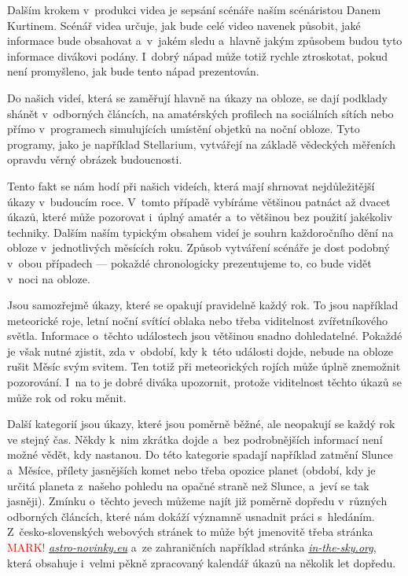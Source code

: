 \documentclass[12pt,a4paper,titlepage]{article}
\newcommand{\link}[2]{\href{#1}{\textit{#2}}}%
\newcommand{\todo}[1]{\textcolor{red}{#1}}
\begin{document}
Dalším krokem v~produkci videa je sepsání scénáře naším scénáristou Danem Kurtinem. Scénář videa určuje, jak bude celé video navenek působit, jaké informace bude obsahovat a~v~jakém sledu a~hlavně jakým způsobem budou tyto informace divákovi podány. I~dobrý nápad může totiž rychle ztroskotat, pokud není promyšleno, jak bude tento nápad prezentován.

Do našich videí, která se zaměřují hlavně na úkazy na obloze, se dají podklady shánět v~odborných článcích, na amatérských profilech na sociálních sítích nebo přímo v~programech simulujících umístění objetků na noční obloze. Tyto programy, jako je například Stellarium, vytvářejí na základě vědeckých měřeních opravdu věrný obrázek budoucnosti. 

Tento fakt se nám hodí při našich videích, která mají shrnovat nejdůležitější úkazy v~budoucím roce. V~tomto případě vybíráme většinou patnáct až dvacet úkazů, které může pozorovat i~úplný amatér a~to většinou bez použití jakékoliv techniky. Dalším naším typickým obsahem videí je souhrn každoročního dění na obloze v~jednotlivých měsících roku. Způsob vytváření scénáře je dost podobný v~obou případech --- pokaždé chronologicky prezentujeme to, co bude vidět v~noci na obloze.

Jsou samozřejmě úkazy, které se opakují pravidelně každý rok. To jsou například meteorické roje, letní noční svítící oblaka nebo třeba viditelnost zvířetníkového světla. Informace o~těchto událostech jsou většinou snadno dohledatelné. Pokaždé je však nutné zjistit, zda v~období, kdy k~této události dojde, nebude na obloze rušit Měsíc svým svitem. Ten totiž při meteorických rojích může úplně znemožnit pozorování. I~na to je dobré diváka upozornit, protože viditelnost těchto úkazů se může rok od roku měnit.

Další kategorií jsou úkazy, které jsou poměrně běžné, ale neopakují se každý rok ve stejný čas. Někdy k~nim zkrátka dojde a~bez podrobnějších informací není možné vědět, kdy nastanou. Do této kategorie spadají například zatmění Slunce a~Měsíce, přílety jasnějších komet nebo třeba opozice planet (období, kdy je určitá planeta z~našeho pohledu na opačné straně než Slunce, a~jeví se tak jasněji). Zmínku o~těchto jevech můžeme najít již poměrně dopředu v~různých odborných článcích, které nám dokáží významně usnadnit práci s~hledáním. Z~česko-slovenských webových stránek to může být jmenovitě třeba stránka \todo{MARK!} \link{https://www.astro-novinky.eu}{astro-novinky.eu} a~ze zahraničních například stránka \link{https://in-the-sky.org}{in-the-sky.org}, která obsahuje i~velmi pěkně zpracovaný kalendář úkazů na několik let dopředu.
\end{document}
